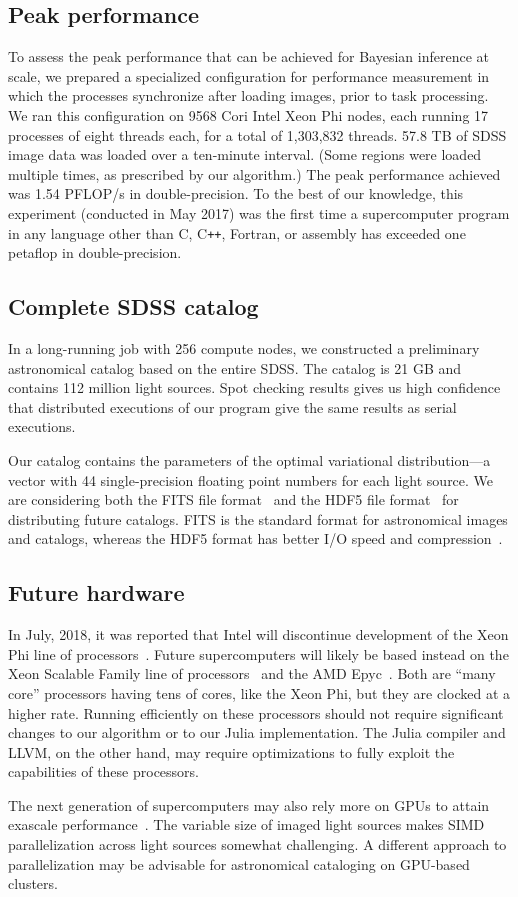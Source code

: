 \subsection{Peak performance}
To assess the peak performance that can be achieved for Bayesian inference at scale, we prepared a specialized configuration for performance measurement in which the processes synchronize after loading images, prior to task processing. We ran this configuration on 9568 Cori Intel Xeon Phi nodes, each running 17 processes of eight threads each, for a total of 1,303,832 threads. 57.8 TB of SDSS image data was loaded over a ten-minute interval. (Some regions were loaded multiple times, as prescribed by our algorithm.) The peak performance achieved was 1.54 PFLOP/s in double-precision. To the best of our knowledge, this experiment (conducted in May 2017) was the first time a supercomputer program in any language other than C, C\texttt{++}, Fortran, or assembly has exceeded one petaflop in double-precision.

\subsection{Complete SDSS catalog}
In a long-running job with 256 compute nodes, we constructed a preliminary astronomical catalog based on the entire SDSS. The catalog is 21 GB and contains 112 million light sources. Spot checking results gives us high confidence that distributed executions of our program give the same results as serial executions.

Our catalog contains the parameters of the optimal variational distribution---a vector with 44 single-precision floating point numbers for each light source.
We are considering both the FITS file format~\citep{wells1979fits} and the HDF5 file format~\citep{folk2011overview} for distributing future catalogs.
FITS is the standard format for astronomical images and catalogs, whereas the HDF5 format has better I/O speed and compression~\citep{price2015hdfits}.

\subsection{Future hardware}
In July, 2018, it was reported that Intel will discontinue development of the Xeon Phi line of processors~\citep{phieol}.
Future supercomputers will likely be based instead on the Xeon Scalable Family line of processors~\citep{intelroadmap} and the AMD Epyc~\citep{amdepyc}.
Both are ``many core'' processors having tens of cores, like the Xeon Phi, but they are clocked at a higher rate. Running efficiently on these processors should not require significant changes to our algorithm or to our Julia implementation. The Julia compiler and LLVM, on the other hand, may require optimizations to fully exploit the capabilities of these processors.

The next generation of supercomputers may also rely more on GPUs to attain exascale performance~\citep{summit}.
The variable size of imaged light sources makes SIMD parallelization across light sources somewhat challenging.
A different approach to parallelization may be advisable for astronomical cataloging on GPU-based clusters.

